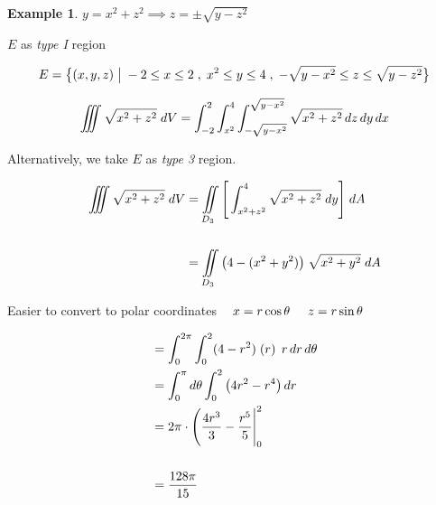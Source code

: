 \documentclass[11pt,a4paper]{article}
\theoremstyle{definition}
\newtheorem{exa}[thm]{Example}
\begin{document}
\begin{exa}
$y = x^2 + z^2\implies z = \pm \sqrt{y - z^2}$


$E$ as \textit{type I} region 

$$E = \big\{ (x,y,z)\hspace{0.1cm} \big|\hspace{0.1cm} -2\leq x \leq 2 \hspace{0.1cm}, \hspace{0.1cm} x^2 \leq y \leq 4\hspace{0.1cm} , \hspace{0.1cm} -\sqrt{y - x^2} \leq z \leq \sqrt{y - z^2}\big\}$$

$$\iiint \sqrt{x^2 + z^2}\hspace{0.1cm}dV = \int^2_{-2}\int^4_{x^2}\int^{\sqrt{y - x^2}}_{-\sqrt{y - x^2}}\sqrt{x^2 + z^2}\,dz\,dy\,dx$$


Alternatively, we take $E$ as \textit{type 3} region.


\begin{figure}[H]
\centering
{}
\end{figure}

\begin{align*}
\iiint \sqrt{x^2 + z^2}\hspace{0.1cm}dV & = \iint\limits_{D_3} \Bigg[ \int^4_{x^2 + z^2}\sqrt{x^2 + z^2}\hspace{0.1cm} dy\Bigg]\hspace{0.1cm}dA\\\\
& = \iint\limits_{D_3}\big( 4 -(x^2 + y^2)\big) \hspace{0.1cm} \sqrt{x^2 + y^2}\hspace{0.1cm}dA\\
\end{align*}

Easier to convert to polar coordinates $\hspace{0.3cm} x = r \cos \theta \hspace{0.5cm} z = r\sin \theta$

\begin{align*}
 & = \int^{2\pi}_0 \int^2_0 (4-r^2)\hspace{0.1cm}(r)\hspace{0.1cm} \,r\,dr\,d\theta\\
 &  = \int^{\pi}_0 d\theta \int^2_0 \big(4r^2 - r^4\big)\, dr\\
 & = 2\pi \cdot\Bigg(\frac{4r^3}{3}-\frac{r^5}{5}\Bigg|^2_0\\\\
 & = \frac{128\pi}{15}\\\\
\end{align*}

\pagebreak
\end{exa}
\end{document}
